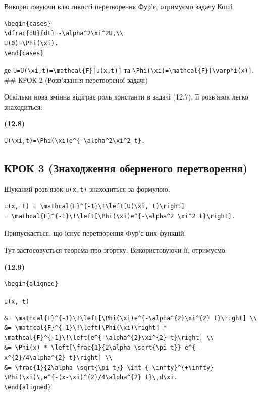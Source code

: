 \documentclass[
  ukrainian,
]{article}
\begin{document}
Використовуючи властивості перетворення Фур'є, отримуємо задачу Коші

\begin{verbatim}
\begin{cases}
\dfrac{dU}{dt}=-\alpha^2\xi^2U,\\
U(0)=\Phi(\xi).
\end{cases}
\end{verbatim}

де
\texttt{U=U(\textbackslash{}xi,t)=\textbackslash{}mathcal\{F\}{[}u(x,t){]}}
та
\texttt{\textbackslash{}Phi(\textbackslash{}xi)=\textbackslash{}mathcal\{F\}{[}\textbackslash{}varphi(x){]}}.
\#\# КРОК 2 (Розв'язання перетвореної задачі)

Оскільки нова змінна відіграє роль константи в задачі (12.7), її
розв'язок легко знаходиться:

\textbf{(12.8)}

\begin{verbatim}
U(\xi,t)=\Phi(\xi)e^{-\alpha^2\xi^2 t}.
\end{verbatim}

\subsection{КРОК 3 (Знаходження оберненого
перетворення)}\label{ux43aux440ux43eux43a-3-ux437ux43dux430ux445ux43eux434ux436ux435ux43dux43dux44f-ux43eux431ux435ux440ux43dux435ux43dux43eux433ux43e-ux43fux435ux440ux435ux442ux432ux43eux440ux435ux43dux43dux44f}

Шуканий розв'язок \texttt{u(x,t)} знаходиться за формулою:

\begin{verbatim}
u(x, t) = \mathcal{F}^{-1}\!\left[U(\xi, t)\right]
= \mathcal{F}^{-1}\!\left[\Phi(\xi)e^{-\alpha^2 \xi^2 t}\right].
\end{verbatim}

Припускається, що існує перетворення Фур'є цих функцій.

Тут застосовується теорема про згортку. Використовуючи її, отримуємо:

\textbf{(12.9)}

\begin{verbatim}
\begin{aligned}
\end{verbatim}

\texttt{u(x,\ t)}

\begin{verbatim}
&= \mathcal{F}^{-1}\!\left[\Phi(\xi)e^{-\alpha^{2}\xi^{2} t}\right] \\
&= \mathcal{F}^{-1}\!\left[\Phi(\xi)\right] * \mathcal{F}^{-1}\!\left[e^{-\alpha^{2}\xi^{2} t}\right] \\
&= \Phi(x) * \left[\frac{1}{2\alpha \sqrt{\pi t}} e^{-x^{2}/4\alpha^{2} t}\right] \\
&= \frac{1}{2\alpha \sqrt{\pi t}} \int_{-\infty}^{+\infty} \Phi(\xi)\,e^{-(x-\xi)^{2}/4\alpha^{2} t}\,d\xi.
\end{aligned}
\end{verbatim}
\end{document}
